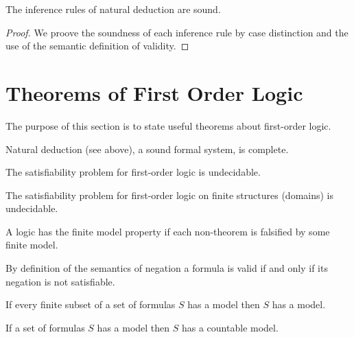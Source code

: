 \begin{theorem}[Soundness]
	The inference rules of natural deduction are sound.
\end{theorem}

\begin{proof}
	We proove the soundness of each inference rule by case distinction and the use of the semantic definition of validity.
\end{proof}

\section{Theorems of First Order Logic}\label{sec:decidable:fol:theorems}

The purpose of this section is to state useful theorems about first-order logic.

\begin{theorem}
	Natural deduction (see above), a sound formal system, is complete.
\end{theorem}

\begin{theorem}
	The satisfiability problem for first-order logic is undecidable.
\end{theorem}

\begin{theorem}
	The satisfiability problem for first-order logic on {\myem finite} structures (domains) is undecidable.
\end{theorem}

\begin{definition}
	A logic has the finite model property if each non-theorem is falsified by some finite model.
\end{definition}

\begin{lemma}[Refutation]
	By definition of the semantics of negation a formula is valid if and only if its negation is not satisfiable.
\end{lemma}

\begin{theorem}\label{the:compactness}
	If every finite subset of a set of formulas $S$ has a model then $S$ has a model. 
\end{theorem}

\begin{theorem}\label{the:loewenheim}
	If a set of formulas $S$ has a model then $S$ has a countable model.
\end{theorem}

